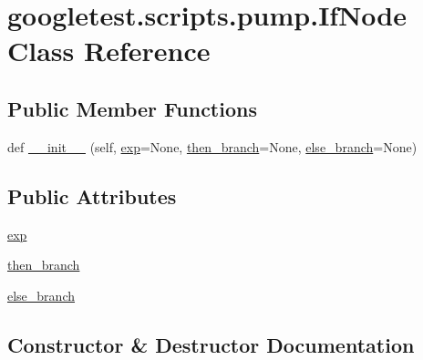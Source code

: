 \hypertarget{classgoogletest_1_1scripts_1_1pump_1_1_if_node}{}\section{googletest.\+scripts.\+pump.\+If\+Node Class Reference}
\label{classgoogletest_1_1scripts_1_1pump_1_1_if_node}
\subsection*{Public Member Functions}
\begin{DoxyCompactItemize}
\item 
def \mbox{\hyperlink{classgoogletest_1_1scripts_1_1pump_1_1_if_node_a06c1c72955dc6b16126ee9ff9568e934}{\+\_\+\+\_\+init\+\_\+\+\_\+}} (self, \mbox{\hyperlink{classgoogletest_1_1scripts_1_1pump_1_1_if_node_a5bfa7764a9f0bc6597d9afe173f560c3}{exp}}=None, \mbox{\hyperlink{classgoogletest_1_1scripts_1_1pump_1_1_if_node_afafc36e77c258b2583b2d9bbe1689c6c}{then\+\_\+branch}}=None, \mbox{\hyperlink{classgoogletest_1_1scripts_1_1pump_1_1_if_node_ac79659314d4a8bc750fd395b7491941b}{else\+\_\+branch}}=None)
\end{DoxyCompactItemize}
\subsection*{Public Attributes}
\begin{DoxyCompactItemize}
\item 
\mbox{\hyperlink{classgoogletest_1_1scripts_1_1pump_1_1_if_node_a5bfa7764a9f0bc6597d9afe173f560c3}{exp}}
\item 
\mbox{\hyperlink{classgoogletest_1_1scripts_1_1pump_1_1_if_node_afafc36e77c258b2583b2d9bbe1689c6c}{then\+\_\+branch}}
\item 
\mbox{\hyperlink{classgoogletest_1_1scripts_1_1pump_1_1_if_node_ac79659314d4a8bc750fd395b7491941b}{else\+\_\+branch}}
\end{DoxyCompactItemize}


\subsection{Constructor \& Destructor Documentation}
\mbox{\label{classgoogletest_1_1scripts_1_1pump_1_1_if_node_a06c1c72955dc6b16126ee9ff9568e934}} 
